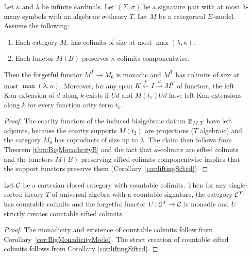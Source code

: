 \begin{corollary}\label{cor:BigMonadicityModel}
    Let $\kappa$ and $\lambda$ be infinite cardinals. Let $(\Sigma,\sigma)$ be a signature pair with at most $\lambda$-many symbols with an algebraic $\sigma$-theory $T$. Let $M$ be a categorical $\Sigma$-model. Assume the following:
    \begin{enumerate}
        \item Each category $M_c$ has colimits of size at most $\max(\lambda,\kappa)$.
        \item Each functor $M(B)$ preserves $\kappa$-colimits componentwise.
    \end{enumerate}
    Then the forgetful functor $M^T\to M_0$ is monadic and $M^T$ has colimits of size at most $\max(\lambda,\kappa)$. Moreover, for any span $K\xleftarrow{k} I\xrightarrow{d} M^T$ of functors, the left Kan extension of $d$ along $k$ exists if $Ud$ and $M(t_1)Ud$ have left Kan extensions along $k$ for every function arity term $t_1$.
\end{corollary}
\begin{proof}
    The coarity functors of the induced bialgebraic datum $\mathbb{B}_{M,T}$ have left adjoints, because the coarity supports $M(t_2)$ are projections ($T$ algebraic) and the category $M_0$ has coproducts of size up to $\lambda$. The claim then follows from Theorem \ref{thm:BigMonadicityB} and the fact that $\kappa$-colimits are sifted colimits and the functors $M(B)$ preserving sifted colimits componentwise implies that the support functors preserve them (Corollary~\ref{cor:liftingSifted}).
\end{proof}
\begin{corollary}
    Let $\mathcal{C}$ be a cartesian closed category with countable colimits. Then for any single-sorted theory $T$ of universal algebra with a countable signature, the category $\mathcal{C}^T$ has countable colimits and the forgetful functor $U\colon \mathcal{C}^T\to \mathcal{C}$ is monadic and $U$ strictly creates countable sifted colimits.
\end{corollary}
\begin{proof}
    The monadicity and existence of countable colimits follow from Corollary~\ref{cor:BigMonadicityModel}. The strict creation of countable sifted colimits follows from Corollary \ref{cor:liftingSifted}.
\end{proof}

